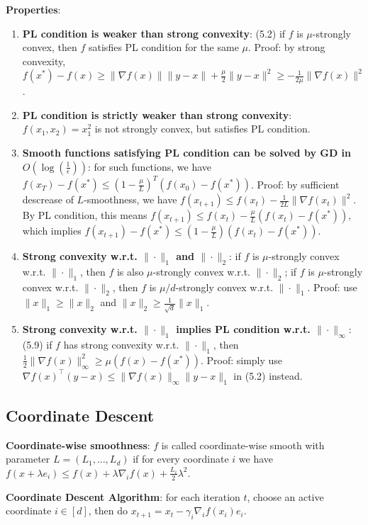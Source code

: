 \textbf{Properties}:
\begin{enumerate}
    \item \textbf{PL condition is weaker than strong convexity}: (5.2) if $f$ is $\mu$-strongly convex, then $f$ satisfies PL condition for the same $\mu$. Proof: by strong convexity, $f(x^*) - f(x) \ge \|\nabla f(x)\| \|y-x\| + \frac{\mu}{2} \|y-x\|^2 \ge -\frac{1}{2\mu}\|\nabla f(x)\|^2$.
    \item \textbf{PL condition is strictly weaker than strong convexity}: $f(x_1, x_2) = x_1^2$ is not strongly convex, but satisfies PL condition.
    \item \textbf{Smooth functions satisfying PL condition can be solved by GD in $O(\log(\frac{1}{\epsilon}))$}: for such functions, we have $f(x_T) - f(x^*) \le (1-\frac{\mu}{L})^T (f(x_0) - f(x^*))$. Proof: by sufficient descrease of $L$-smoothness, we have $f(x_{t+1}) \le f(x_t) - \frac{1}{2L}\|\nabla f(x_t)\|^2$. By PL condition, this means $f(x_{t+1}) \le f(x_t) - \frac{\mu}{L} (f(x_t) - f(x^*))$, which implies $f(x_{t+1}) - f(x^*) \le (1-\frac{\mu}{L}) (f(x_t) - f(x^*))$.
    \item \textbf{Strong convexity w.r.t. $\|\cdot\|_1$ and $\|\cdot\|_2$}: if $f$ is $\mu$-strongly convex w.r.t. $\|\cdot\|_1$, then $f$ is also $\mu$-strongly convex w.r.t. $\|\cdot\|_2$; if $f$ is $\mu$-strongly convex w.r.t. $\|\cdot\|_2$, then $f$ is $\mu / d$-strongly convex w.r.t. $\|\cdot\|_1$. Proof: use $\|x\|_1 \ge \|x\|_2$ and $\|x\|_2 \ge \frac{1}{\sqrt{d}}\|x\|_1$.
    \item \textbf{Strong convexity w.r.t. $\|\cdot\|_1$ implies PL condition w.r.t. $\|\cdot\|_\infty$}: (5.9) if $f$ has strong convexity w.r.t. $\|\cdot\|_1$, then $\frac{1}{2}\|\nabla f(x)\|_\infty^2 \ge \mu (f(x) - f(x^*))$. Proof: simply use $\nabla f(x)^\top (y-x) \le \|\nabla f(x)\|_\infty \|y-x\|_1$ in (5.2) instead.
\end{enumerate}


\subsection{Coordinate Descent}

\textbf{Coordinate-wise smoothness}: $f$ is called coordinate-wise smooth with parameter $L = (L_1, \dots, L_d)$ if for every coordinate $i$ we have $f(x + \lambda e_i) \le f(x) + \lambda \nabla_i f(x) + \frac{L_i}{2} \lambda^2$.

\textbf{Coordinate Descent Algorithm}: for each iteration $t$, choose an active coordinate $i \in [d]$, then do $x_{t+1} = x_t - \gamma_i \nabla_i f(x_i) e_i$.

